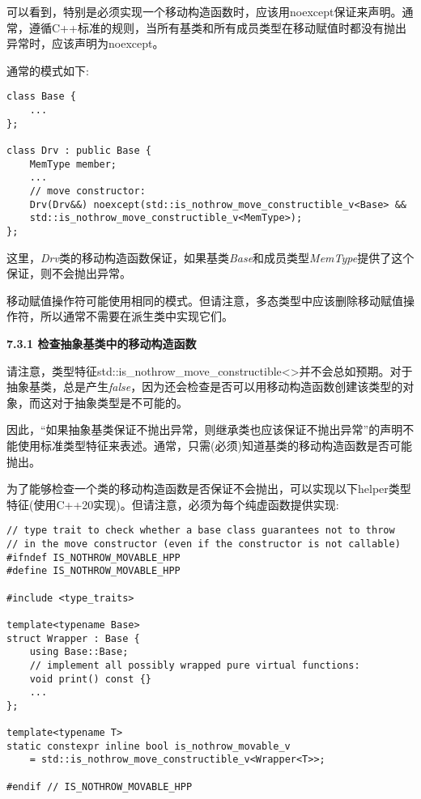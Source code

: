 可以看到，特别是必须实现一个移动构造函数时，应该用noexcept保证来声明。通常，遵循C++标准的规则，当所有基类和所有成员类型在移动赋值时都没有抛出异常时，应该声明为noexcept。\par

通常的模式如下:\par

\begin{lstlisting}[caption={}]
class Base {
	...
};

class Drv : public Base {
	MemType member;
	...
	// move constructor:
	Drv(Drv&&) noexcept(std::is_nothrow_move_constructible_v<Base> &&
	std::is_nothrow_move_constructible_v<MemType>);
};
\end{lstlisting}

这里，\textit{Drv}类的移动构造函数保证，如果基类\textit{Base}和成员类型\textit{MemType}提供了这个保证，则不会抛出异常。\par

移动赋值操作符可能使用相同的模式。但请注意，多态类型中应该删除移动赋值操作符，所以通常不需要在派生类中实现它们。\par

\hspace*{\fill} \par %
\textbf{7.3.1 检查抽象基类中的移动构造函数}

请注意，类型特征std::is\_nothrow\_move\_constructible<>并不会总如预期。对于抽象基类，总是产生\textit{false}，因为还会检查是否可以用移动构造函数创建该类型的对象，而这对于抽象类型是不可能的。\par

因此，“如果抽象基类保证不抛出异常，则继承类也应该保证不抛出异常”的声明不能使用标准类型特征来表述。通常，只需(必须)知道基类的移动构造函数是否可能抛出。\par

为了能够检查一个类的移动构造函数是否保证不会抛出，可以实现以下helper类型特征(使用C++20实现)。但请注意，必须为每个纯虚函数提供实现:\par

{\color{red}{poly/isnothrowmovable.hpp}}\par

\begin{lstlisting}[caption={}]
// type trait to check whether a base class guarantees not to throw
// in the move constructor (even if the constructor is not callable)
#ifndef IS_NOTHROW_MOVABLE_HPP
#define IS_NOTHROW_MOVABLE_HPP

#include <type_traits>

template<typename Base>
struct Wrapper : Base {
	using Base::Base;
	// implement all possibly wrapped pure virtual functions:
	void print() const {}
	...
};

template<typename T>
static constexpr inline bool is_nothrow_movable_v
	= std::is_nothrow_move_constructible_v<Wrapper<T>>;

#endif // IS_NOTHROW_MOVABLE_HPP
\end{lstlisting}

